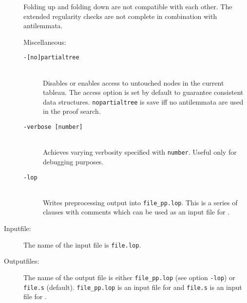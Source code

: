 \begin{description}
{      \begin{remark}
      Folding up and folding down are  not  compatible  with  each
      other.   The  extended regularity checks are not complete in
      combination with antilemmata.
      \end{remark}  

      Miscellaneous:
      \begin{description}
      \item[{\tt -[no]partialtree}]
           {\ \\
            Disables or enables access to untouched  nodes  in  the
            current tableau. The access option is set by default to
            guarantee consistent data  structures.  {\tt nopartialtree}
            is  save  iff  no  antilemmata  are  used  in the proof
            search.}
      \item[{\tt -verbose [number]}]
           {\ \\
            Achieves varying  verbosity  specified  with  {\tt number}.
            Useful only for debugging purposes.}
      \item[{\tt -lop}]
          {\ \\
            Writes preprocessing output into {\tt file\_pp.lop}.
            This is a series of \LOP\/ clauses with comments which can
            be used as an input file for \inw.}
      \end{description}}
\item[Inputfile:]
     {The name of the input file is {\tt file.lop}.}
\item[Outputfiles:]
     {The name of the output file is either {\tt file\_pp.lop} 
      (see option {\tt -lop}) or {\tt file.s} (default). 
      {\tt file\_pp.lop} is an input file for \inw\/ and {\tt file.s} is an
      input file for \wasm.}
\end{description}





